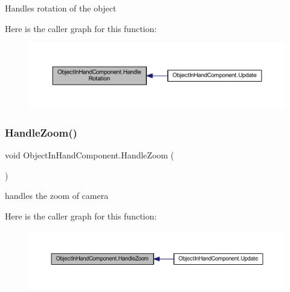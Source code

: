 Handles rotation of the object 

Here is the caller graph for this function\+:
\nopagebreak
\begin{figure}[H]
\begin{center}
\leavevmode
\includegraphics[width=350pt]{class_object_in_hand_component_aa00e6e5af513b7c24e36e7e74b1f7ae4_icgraph}
\end{center}
\end{figure}
\mbox{\label{class_object_in_hand_component_a01fb8169d53ed7176d1aae0729f7caa1}} 
\subsubsection{\texorpdfstring{Handle\+Zoom()}{HandleZoom()}}
{\footnotesize\ttfamily void Object\+In\+Hand\+Component.\+Handle\+Zoom (\begin{DoxyParamCaption}{ }\end{DoxyParamCaption})\hspace{0.3cm}{\ttfamily [private]}}



handles the zoom of camera 

Here is the caller graph for this function\+:
\nopagebreak
\begin{figure}[H]
\begin{center}
\leavevmode
\includegraphics[width=350pt]{class_object_in_hand_component_a01fb8169d53ed7176d1aae0729f7caa1_icgraph}
\end{center}
\end{figure}
\mbox{\label{class_object_in_hand_component_a3399bcee7bffea9b599f1dd8d6e2a93c}} 
